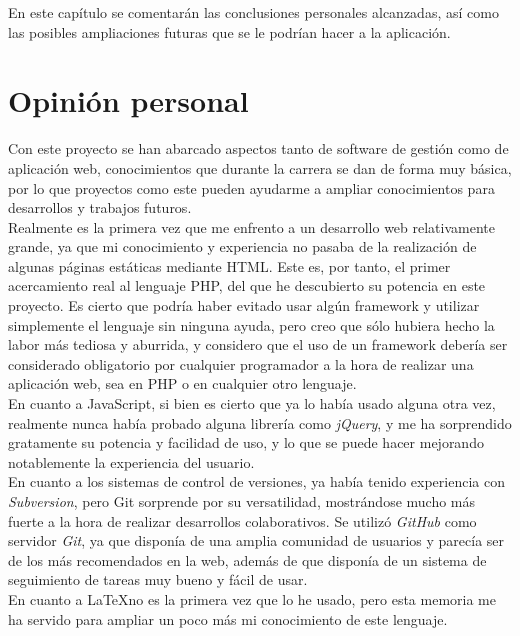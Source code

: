En este capítulo se comentarán las conclusiones personales alcanzadas, así como las posibles ampliaciones futuras que se le podrían hacer a la aplicación.

\section{Opinión personal}

Con este proyecto se han abarcado aspectos tanto de software de gestión como de aplicación web, conocimientos que durante la carrera se dan de forma muy básica, por lo que proyectos como este pueden ayudarme a ampliar conocimientos para desarrollos y trabajos futuros.\\

Realmente es la primera vez que me enfrento a un desarrollo web relativamente grande, ya que mi conocimiento y experiencia no pasaba de la realización de algunas páginas estáticas mediante HTML. Este es, por tanto, el primer acercamiento real al lenguaje PHP, del que he descubierto su potencia en este proyecto. Es cierto que podría haber evitado usar algún framework y utilizar simplemente el lenguaje sin ninguna ayuda, pero creo que sólo hubiera hecho la labor más tediosa y aburrida, y considero que el uso de un framework debería ser considerado obligatorio por cualquier programador a la hora de realizar una aplicación web, sea en PHP o en cualquier otro lenguaje.\\

En cuanto a JavaScript, si bien es cierto que ya lo había usado alguna otra vez, realmente nunca había probado alguna librería como  {\em jQuery}, y me ha sorprendido gratamente su potencia y facilidad de uso, y lo que se puede hacer mejorando notablemente la experiencia del usuario.\\

En cuanto a los sistemas de control de versiones, ya había tenido experiencia con {\em Subversion}, pero Git sorprende por su versatilidad, mostrándose mucho más fuerte a la hora de realizar desarrollos colaborativos. Se utilizó {\em GitHub} como servidor {\em Git}, ya que disponía de una amplia comunidad de usuarios y parecía ser de los más recomendados en la web, además de que disponía de un sistema de seguimiento de tareas muy bueno y fácil de usar.\\

En cuanto a \LaTeX no es la primera vez que lo he usado, pero esta memoria me ha servido para ampliar un poco más mi conocimiento de este lenguaje.

